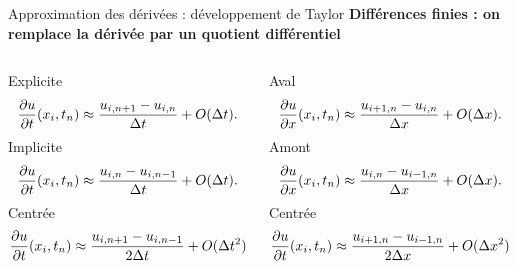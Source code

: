 \documentclass[aspectratio=169, french]{beamer}
\begin{document}
\begin{frame}{Approximation des dérivées : développement de Taylor}
	\textbf{Différences finies : on remplace la dérivée par un quotient différentiel}
	
	
	\begin{columns}
		\begin{column}{.5\textwidth}
			\begin{tcolorbox}[title=Discrétisation en temps, coltitle=white]
				Explicite
				\begin{equation*}
					\begin{aligned}
						\diffp{u}{t}(x_i, t_n) \approx \frac{u_{i, n+1} - u_{i, n}}{\Delta t} + O(\Delta t).
					\end{aligned}
				\end{equation*}
				Implicite
				\begin{equation*}
					\begin{aligned}
						\diffp{u}{t}(x_i, t_n) \approx \frac{u_{i, n} - u_{i, n-1}}{\Delta t} + O(\Delta t).
					\end{aligned}
				\end{equation*}
				Centrée
				\begin{equation*}
					\begin{aligned}
						\diffp{u}{t}(x_i, t_n) \approx \frac{u_{i, n+1} - u_{i, n-1}}{2\Delta t} + O(\Delta t^2)
					\end{aligned}
				\end{equation*}
			\end{tcolorbox}
		\end{column}
		\begin{column}{.5\textwidth}
			\begin{tcolorbox}[title=Discrétisation en espace, coltitle=white]
				Aval
				\begin{equation*}
					\diffp{u}{x}(x_i, t_n) \approx \frac{u_{i+1, n} - u_{i, n}}{\Delta x} + O(\Delta x).
				\end{equation*}
				Amont
				\begin{equation*}
					\diffp{u}{x}(x_i, t_n) \approx \frac{u_{i, n} - u_{i-1, n}}{\Delta x} + O(\Delta x).
				\end{equation*}
				Centrée
				\begin{equation*}
					\diffp{u}{t}(x_i, t_n) \approx \frac{u_{i+1, n} - u_{i-1, n}}{2\Delta x} + O(\Delta x^2)
				\end{equation*}
			\end{tcolorbox}
			\end{column}
		\end{columns}	
	
	
\end{frame}
\end{document}
